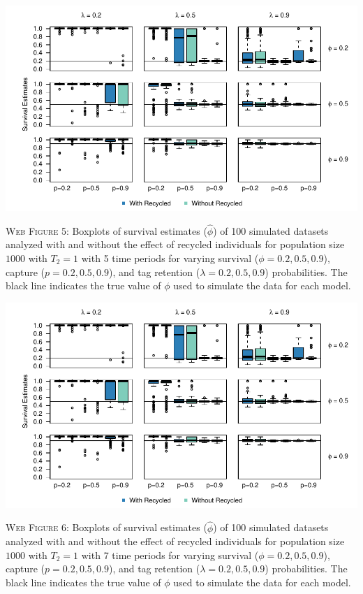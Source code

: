 \documentclass[]{article}
\begin{document}
\newpage

\includegraphics{Appendix_files/figure-latex/5_survival_GJSTL5-1.pdf}

\textsc{Web Figure 5:} Boxplots of survival estimates (\(\hat{\phi}\))
of 100 simulated datasets analyzed with and without the effect of
recycled individuals for population size \(1000\) with \(T_2=1\) with 5
time periods for varying survival (\(\phi=0.2,0.5,0.9\)), capture
(\(p=0.2,0.5,0.9\)), and tag retention (\(\lambda=0.2,0.5,0.9\))
probabilities. The black line indicates the true value of \(\phi\) used
to simulate the data for each model.

\includegraphics{Appendix_files/figure-latex/6_survival_GJSTL6-1.pdf}

\textsc{Web Figure 6:} Boxplots of survival estimates (\(\hat{\phi}\))
of 100 simulated datasets analyzed with and without the effect of
recycled individuals for population size \(1000\) with \(T_2=1\) with 7
time periods for varying survival (\(\phi=0.2,0.5,0.9\)), capture
(\(p=0.2,0.5,0.9\)), and tag retention (\(\lambda=0.2,0.5,0.9\))
probabilities. The black line indicates the true value of \(\phi\) used
to simulate the data for each model.
\end{document}
